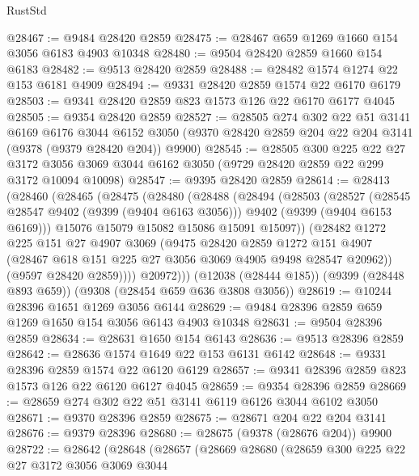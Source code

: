 \begin{lexlean}{RustStd}
\begin{coremodule}
@28467 := @9484 @28420 @2859
@28475 := @28467 @659 @1269 @1660 @154 @3056 @6183 @4903 @10348
@28480 := @9504 @28420 @2859 @1660 @154 @6183
@28482 := @9513 @28420 @2859
@28488 := @28482 @1574 @1274 @22 @153 @6181 @4909
@28494 := @9331 @28420 @2859 @1574 @22 @6170 @6179
@28503 := @9341 @28420 @2859 @823 @1573 @126 @22 @6170 @6177 @4045
@28505 := @9354 @28420 @2859
@28527 := @28505
    @274
    @302
    @22
    @51
    @3141
    @6169
    @6176
    @3044
    @6152
    @3050
    (@9370 @28420 @2859 @204 @22 @204 @3141 (@9378 (@9379 @28420 @204)) @9900)
@28545 := @28505
    @300
    @225
    @22
    @27
    @3172
    @3056
    @3069
    @3044
    @6162
    @3050
    (@9729 @28420 @2859 @22 @299 @3172 @10094 @10098)
@28547 := @9395 @28420 @2859
@28614 := @28413
    (@28460
      (@28465
        (@28475
          (@28480
            (@28488
              (@28494
                (@28503
                  (@28527
                    (@28545 @28547 @9402 (@9399 (@9404 @6163 @3056)))
                    @9402
                    (@9399 (@9404 @6153 @6169)))
                  @15076
                  @15079
                  @15082
                  @15086
                  @15091
                  @15097))
              (@28482
                @1272
                @225
                @151
                @27
                @4907
                @3069
                (@9475
                  @28420
                  @2859
                  @1272
                  @151
                  @4907
                  (@28467 @618 @151 @225 @27 @3056 @3069 @4905 @9498 @28547 @20962))
                (@9597 @28420 @2859))))
          @20972)))
    (@12038 (@28444 @185))
    (@9399 (@28448 @893 @659))
    (@9308 (@28454 @659 @636 @3808 @3056))
@28619 := @10244 @28396 @1651 @1269 @3056 @6144
@28629 := @9484 @28396 @2859 @659 @1269 @1650 @154 @3056 @6143 @4903 @10348
@28631 := @9504 @28396 @2859
@28634 := @28631 @1650 @154 @6143
@28636 := @9513 @28396 @2859
@28642 := @28636 @1574 @1649 @22 @153 @6131 @6142
@28648 := @9331 @28396 @2859 @1574 @22 @6120 @6129
@28657 := @9341 @28396 @2859 @823 @1573 @126 @22 @6120 @6127 @4045
@28659 := @9354 @28396 @2859
@28669 := @28659 @274 @302 @22 @51 @3141 @6119 @6126 @3044 @6102 @3050
@28671 := @9370 @28396 @2859
@28675 := @28671 @204 @22 @204 @3141
@28676 := @9379 @28396
@28680 := @28675 (@9378 (@28676 @204)) @9900
@28722 := @28642
    (@28648
      (@28657
        (@28669
          @28680
          (@28659
            @300
            @225
            @22
            @27
            @3172
            @3056
            @3069
            @3044

\end{coremodule}
\end{lexlean}
